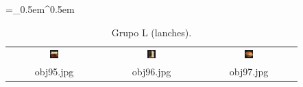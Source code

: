 \begin{table}[H]
  \centering
  \caption{Grupo L (lanches).}
  \tabulinesep =_0.5em^0.5em
  \everyrow{\tabucline[0.4pt]-}
  \begin{tabu}{|ccc|}
    \includegraphics[width=0.1\textwidth,height=0.1\textwidth]{imagens/coil_100/lanches/obj53__0.png} &
    \includegraphics[width=0.1\textwidth,height=0.1\textwidth]{imagens/coil_100/lanches/obj53__0_1.png} &
    \includegraphics[width=0.1\textwidth,height=0.1\textwidth]{imagens/coil_100/lanches/obj73__0.png}
    \\
    \scriptsize{obj95.jpg} & \scriptsize{obj96.jpg} & \scriptsize{obj97.jpg}
  \end{tabu}
\end{table}

